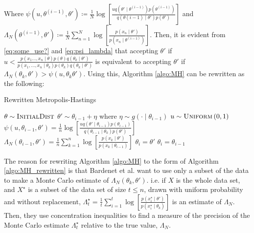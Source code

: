 \documentclass{article}
\theoremstyle{definition}
\begin{document}
Where $\psi\left(u, \theta^{(i-1)}, \theta'\right)\coloneqq \frac{1}{N}\log\left[\frac{u q\left(\theta'\mid\theta^{(i-1)}\right)p\left(\theta^{(i-1)}\right)}{q\left(\theta{(i-1)}\mid \theta'\right)p\left(\theta'\right)}\right]$ and $\Lambda_N\left(\theta^{(i-1)}, \theta'\right) \coloneqq \frac{1}{N}\sum_{n = 1}^N \log\left[\frac{p\left(x_n\mid \theta'\right)}{p\left(x_n\mid\theta^{(i-1)}\right)}\right]$. Then, it is evident from \eqref{eq:some_use?} and \eqref{eq:psi_lambda} that accepting $\theta'$ if $u < \frac{p\left(x_1\ldots, x_n\mid \theta\right)p\left(\theta\right)q\left(\theta_k\mid \theta'\right)}{p\left(x_1, \ldots, x_n\mid \theta_k\right)p\left(\theta_k\right)q\left(\theta_k\mid\theta'\right)}$ is equivalent to accepting $\theta'$ if $\Lambda_N\left(\theta_k, \theta'\right)>\psi\left(u,\theta_k\theta'\right)$. Using this, Algorithm \ref{algo:MH} can be rewritten as the following:
\begin{algorithm}[H] 
    \caption{Rewritten Metropolis-Hastings}
    \label{algo:MH_rewritten}
    \begin{algorithmic}[1] %
        \State $\theta \sim \textsc{InitialDist}$ 
        \State$\theta' \sim \theta_{i-1} + \eta$ where $\eta\sim g\left(\cdot \mid \theta_{i-1}\right)$
        \State $u\sim \textsc{Uniform}\left(0,1\right)$
        \State $\psi\left(u, \theta_{i-1}, \theta'\right) = \frac{1}{n} \log\left[\frac{u q\left(\theta'\mid \theta_{i-1} \right) p \left(\theta_{i-1}\right)}{q\left(\theta_{i-1} \mid \theta_k \right)p\left(\theta'\right)} \right]$
        \State $\Lambda_N \left(\theta_{i-1}, \theta'\right) = \frac{1}{n} \sum_{k = 1}^n \log \left[\frac{p\left(x_{k}\mid \theta'\right)}{p\left(x_{k}\mid \theta_{i-1}\right)}\right]$
        \State $\theta_i = \theta'$
        \Else 
        \State $\theta_i = \theta_{i-1}$
         \EndIf
         \EndFor
    \end{algorithmic}
\end{algorithm}
The reason for rewriting Algorithm \ref{algo:MH} to the form of Algorithm \ref{algo:MH_rewritten} is that Bardenet et al. want to use only a subset of the data to make a Monte Carlo estimate of $\Lambda_N\left(\theta_k, \theta'\right)$. 
i.e. if $X$ is the whole data set, and $X^{\star}$ is a subset of the data set of size $t\leq n$, drawn with uniform probability and without replacement, $\Lambda^{\star}_t = \frac{1}{t} \sum_{i = 1}^t \log\left[\frac{p\left(x_i^{\star}\mid \theta'\right)}{p\left(x_i^{\star}\mid \theta_k\right)}\right]$ is an estimate of $\Lambda_N$.  Then, they use concentration inequalities to find a measure of the precision of the Monte Carlo estimate $\Lambda_t^{\star}$ relative to the true value,  $\Lambda_N$.
\end{document}
